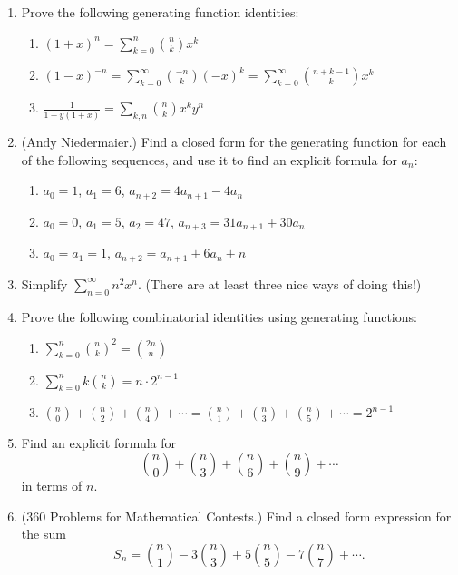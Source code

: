 \documentclass[11pt]{article}
\theoremstyle{definition}
\begin{document}
\begin{enumerate}
\item Prove the following generating function identities:
   \begin{enumerate}
     \item $(1+x)^{n}=\sum_{k=0}^n \binom{n}{k}x^k$
     \item $(1-x)^{-n}=\sum_{k=0}^\infty \binom{-n}{k}(-x)^k=\sum_{k=0}^\infty \binom{n+k-1}{k} x^k$
     \item $\frac{1}{1-y(1+x)}=\sum_{k,n}\binom{n}{k}x^ky^n$
   \end{enumerate}

\item (Andy Niedermaier.)  Find a closed form for the generating function for each of the following sequences, and use it to find an explicit formula for $a_n$:
\begin{enumerate}
  \item $a_0 = 1$, $a_1 = 6$, $a_{n+2} = 4a_{n+1} - 4a_n$
  \item $a_0 = 0$, $a_1 = 5$, $a_2 = 47$, $a_{n+3} = 31a_{n+1} + 30a_n$
  \item $a_0 = a_1 = 1$, $a_{n+2} = a_{n+1} + 6a_n + n$
\end{enumerate}

\item Simplify $\sum_{n=0}^\infty n^2 x^n$.  (There are at least three nice ways of doing this!)

\item Prove the following combinatorial identities using generating functions:
\begin{enumerate}
   \item $\sum_{k=0}^n\binom{n}{k}^2=\binom{2n}{n}$
   \item $\sum_{k=0}^n k \binom{n}{k}=n\cdot 2^{n-1}$
   \item $\binom{n}{0}+\binom{n}{2}+\binom{n}{4}+\cdots=\binom{n}{1}+\binom{n}{3}+\binom{n}{5}+\cdots=2^{n-1}$
\end{enumerate}

\item Find an explicit formula for $$\binom{n}{0}+\binom{n}{3}+\binom{n}{6}+\binom{n}{9}+\cdots$$ in terms of $n$.

\item  (360 Problems for Mathematical Contests.) Find a closed form expression for the sum $$S_n=\binom{n}{1}-3\binom{n}{3}+5\binom{n}{5}-7\binom{n}{7}+\cdots.$$


\end{enumerate}
\end{document}
